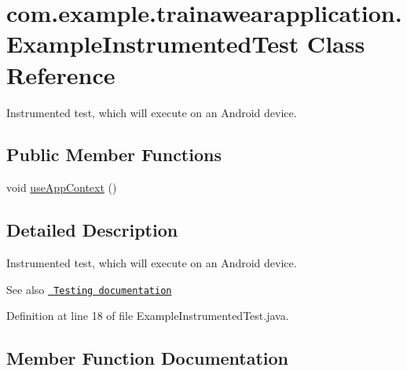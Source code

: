 \hypertarget{classcom_1_1example_1_1trainawearapplication_1_1_example_instrumented_test}{}\section{com.\+example.\+trainawearapplication.\+Example\+Instrumented\+Test Class Reference}
\label{classcom_1_1example_1_1trainawearapplication_1_1_example_instrumented_test}


Instrumented test, which will execute on an Android device.  


\subsection*{Public Member Functions}
\begin{DoxyCompactItemize}
\item 
void \mbox{\hyperlink{classcom_1_1example_1_1trainawearapplication_1_1_example_instrumented_test_a2654021c866c8286bd3cab57bcdb3e85}{use\+App\+Context}} ()
\end{DoxyCompactItemize}


\subsection{Detailed Description}
Instrumented test, which will execute on an Android device. 

\begin{DoxySeeAlso}{See also}
\href{http://d.android.com/tools/testing}{\texttt{ Testing documentation}} 
\end{DoxySeeAlso}


Definition at line 18 of file Example\+Instrumented\+Test.\+java.



\subsection{Member Function Documentation}
\mbox{\label{classcom_1_1example_1_1trainawearapplication_1_1_example_instrumented_test_a2654021c866c8286bd3cab57bcdb3e85}} 
